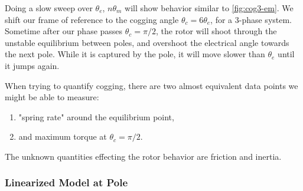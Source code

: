 \documentclass[12pt,a4paper,oneside,openany]{article}
\begin{document}
Doing a slow sweep over $\theta_e$, $n\theta_m$ will show behavior similar to \cref{fig:cog3-em}. We shift our frame of reference to the cogging angle $\theta_c = 6 \theta_e$, for a 3-phase system. Sometime after our phase passes $\theta_c = \pi/2$, the rotor will shoot through the unstable equilibrium between poles, and overshoot the electrical angle towards the next pole. While it is captured by the pole, it will move slower than $\theta_e$ until it jumps again.


When trying to quantify cogging, there are two almost equivalent data points we might be able to measure:
\begin{enumerate}
\item "spring rate" around the equilibrium point,
\item and maximum torque at $\theta_c = \pi/2$.
\end{enumerate}
The unknown quantities effecting the rotor behavior are friction and inertia.

\subsubsection{Linearized Model at Pole}
\end{document}

